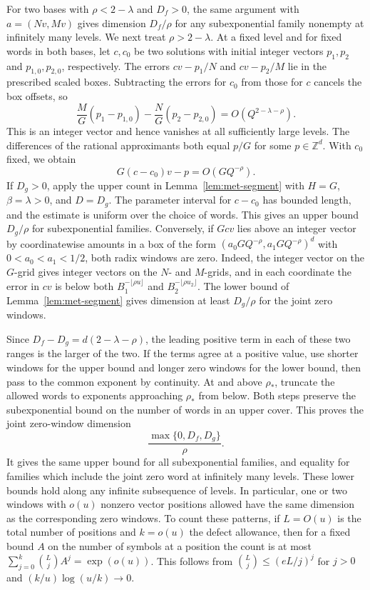 \documentclass[11pt,reqno,a4paper]{amsart}
\theoremstyle{remark}
\begin{document}
For two bases with \(\rho<2-\lambda\) and \(D_f>0\), the same
argument with \(a=(Nv,Mv)\) gives dimension \(D_f/\rho\) for
any subexponential family nonempty at infinitely many levels.
We next treat \(\rho>2-\lambda\). At a fixed level and for fixed
words in both bases, let \(c,c_0\) be two solutions with initial
integer vectors \(p_1,p_2\) and \(p_{1,0},p_{2,0}\), respectively.
The errors \(cv-p_1/N\) and \(cv-p_2/M\) lie in the prescribed
scaled boxes. Subtracting the errors for \(c_0\) from those for
\(c\) cancels the box offsets, so
\[
 \frac{M}{G}(p_1-p_{1,0})-\frac{N}{G}(p_2-p_{2,0})
   = O(Q^{2-\lambda-\rho}).
\]
This is an integer vector and hence vanishes at all sufficiently
large levels. The differences of the rational approximants both
equal \(p/G\) for some \(p\in\mathbb Z^d\). With \(c_0\) fixed,
we obtain
\[
  G(c-c_0)v-p=O(GQ^{-\rho}).
\]
If \(D_g>0\), apply the upper count in
Lemma~\ref{lem:met-segment} with \(H=G\), \(\beta=\lambda>0\),
and \(D=D_g\). The parameter interval for \(c-c_0\) has bounded
length, and the estimate is uniform over the choice of words.
This gives an upper bound \(D_g/\rho\) for subexponential
families. Conversely, if \(Gcv\) lies above an integer vector by
coordinatewise amounts in a box of the form
\((a_0GQ^{-\rho},a_1GQ^{-\rho})^d\) with
\(0<a_0<a_1<1/2\), both radix windows are zero. Indeed, the integer
vector on the \(G\)-grid gives integer vectors on the \(N\)- and
\(M\)-grids, and in each coordinate the error in \(cv\) is below
both \(B_1^{-\lfloor\rho u\rfloor}\) and
\(B_2^{-\lfloor\rho u_2\rfloor}\). The lower bound of
Lemma~\ref{lem:met-segment} gives dimension at least \(D_g/\rho\)
for the joint zero windows.

Since \(D_f-D_g=d(2-\lambda-\rho)\), the leading positive term
in each of these two ranges is the larger of the two. If the
terms agree at a positive value, use shorter windows for the
upper bound and longer zero windows for the lower bound, then
pass to the common exponent by continuity. At and above
\(\rho_*\), truncate the allowed words to exponents approaching
\(\rho_*\) from below. Both steps preserve the subexponential
bound on the number of words in an upper cover. This proves the
joint zero-window dimension
\[
  \frac{\max\{0,D_f,D_g\}}{\rho}.
\]
It gives the same upper bound for all subexponential families,
and equality for families which include the joint zero word
at infinitely many levels. These lower bounds hold along any
infinite subsequence of levels. In particular, one or two
windows with \(o(u)\) nonzero vector positions allowed have the
same dimension as the corresponding zero windows. To count
these patterns, if \(L=O(u)\) is the total number of positions
and \(k=o(u)\) the defect allowance, then for a fixed bound
\(A\) on the number of symbols at a position the count is at
most \(\sum_{j=0}^k\binom{L}{j}A^j=\exp(o(u))\). This follows
from \(\binom{L}{j}\leq(eL/j)^j\) for \(j>0\) and
\((k/u)\log(u/k)\to0\).
\end{document}
